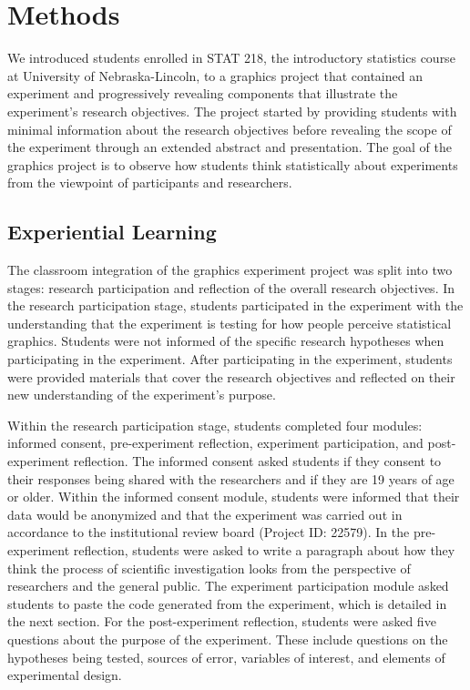 \documentclass[
]{article}
\begin{document}
\section{Methods}\label{methods}

We introduced students enrolled in STAT 218, the introductory statistics
course at University of Nebraska-Lincoln, to a graphics project that
contained an experiment and progressively revealing components that
illustrate the experiment's research objectives. The project started by
providing students with minimal information about the research
objectives before revealing the scope of the experiment through an
extended abstract and presentation. The goal of the graphics project is
to observe how students think statistically about experiments from the
viewpoint of participants and researchers.

\subsection{Experiential Learning}\label{experiential-learning}

The classroom integration of the graphics experiment project was split
into two stages: research participation and reflection of the overall
research objectives. In the research participation stage, students
participated in the experiment with the understanding that the
experiment is testing for how people perceive statistical graphics.
Students were not informed of the specific research hypotheses when
participating in the experiment. After participating in the experiment,
students were provided materials that cover the research objectives and
reflected on their new understanding of the experiment's purpose.

Within the research participation stage, students completed four
modules: informed consent, pre-experiment reflection, experiment
participation, and post-experiment reflection. The informed consent
asked students if they consent to their responses being shared with the
researchers and if they are 19 years of age or older. Within the
informed consent module, students were informed that their data would be
anonymized and that the experiment was carried out in accordance to the
institutional review board (Project ID: 22579). In the pre-experiment
reflection, students were asked to write a paragraph about how they
think the process of scientific investigation looks from the perspective
of researchers and the general public. The experiment participation
module asked students to paste the code generated from the experiment,
which is detailed in the next section. For the post-experiment
reflection, students were asked five questions about the purpose of the
experiment. These include questions on the hypotheses being tested,
sources of error, variables of interest, and elements of experimental
design.
\end{document}
